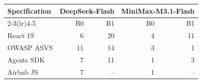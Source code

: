 \begin{tabular}{lrrrr}
\toprule
Specification & \multicolumn{2}{c}{DeepSeek-Flash} & \multicolumn{2}{c}{MiniMax-M3.1-Flash} \\
\cmidrule(lr){2-3}\cmidrule(lr){4-5}
 & B0 & B1 & B0 & B1 \\
\midrule
React 19 & 6 & 20 & 4 & 11 \\
OWASP ASVS & 11 & 14 & 3 & 1 \\
Agents SDK & 7 & 11 & 1 & 3 \\
Airbnb JS & 7 & -- & 1 & -- \\
\bottomrule
\end{tabular}
